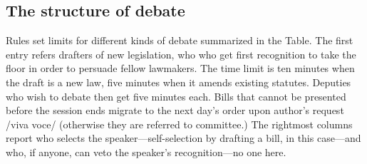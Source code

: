 \documentclass[letter,12pt]{article}
\begin{document}
  \subsection{The structure of debate}
Rules set limits for different kinds of debate summarized in the Table. The first entry refers drafters of new legislation, who who get first recognition to take the floor in order to persuade fellow lawmakers. The time limit is ten minutes when the draft is a new law, five minutes when it amends existing statutes. Deputies who wish to debate then get five minutes each. Bills that cannot be presented before the session ends migrate to the next day's order upon author's request /viva voce/ (otherwise they are referred to committee.) The rightmost columns report who selects the speaker---self-selection by drafting a bill, in this case---and who, if anyone, can veto the speaker's recognition---no one here. 
\end{document}
